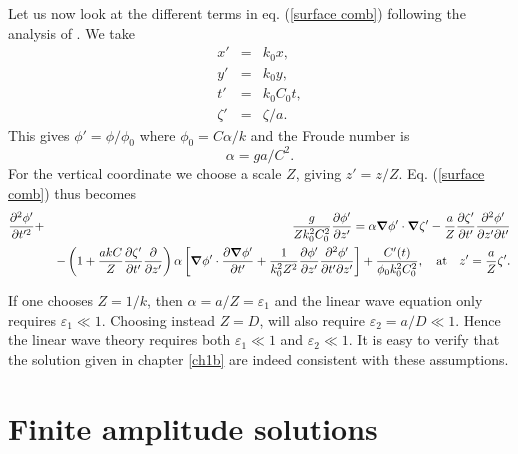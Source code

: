 Let us now look at the different terms in eq. (\ref{surface comb})
 following the analysis of \cite{Kirby1998}. We take 
 \begin{eqnarray}
  x'&=&k_0 x, \\
  y'&=& k_0 y, \\
  t'&=&k_0 C_0 t, \\
  \zeta'&=&\zeta/a.
 \end{eqnarray}
 This gives  $\phi'=\phi/\phi_0$
where $\phi_0= C \alpha /k$ and the Froude number is 
 \begin{equation}
\alpha=g a / C^2.
 \end{equation}
For the vertical coordinate we choose a scale  $Z$, giving $z'=z/Z$. 
Eq. (\ref{surface comb}) thus becomes 
\begin{eqnarray}
   \frac{\partial^2{\phi'}}{\partial{t'^2}}&+&\frac{g}{Z k_0^2 C_0^2} \frac{\partial\phi'}{\partial
   z'}=
\alpha  \mbox{\boldmath $\nabla$}\phi' \cdot \mbox{\boldmath $\nabla$}\zeta' - \frac{a}{Z} \frac{\partial
\zeta'}{\partial t'}\frac{\partial^2 \phi'}{\partial z' \partial t'}
\nonumber\\
& &- \left(1+\frac{akC}{Z} \frac{\partial \zeta'}{\partial t'}\frac{\partial
}{\partial z'}\right) \alpha \left[\mbox{\boldmath $\nabla$}\phi' \cdot
\frac{\partial{\mbox{\boldmath $\nabla$}\phi'}}{\partial t'} + \frac{1}{k_0^2 Z^2}
\frac{\partial\phi'}{\partial z'}\frac{\partial^2\phi'}{\partial t'\partial
z'}\right]+\frac{C'(t)}{\phi_0 k_0^2 C_0^2}, \quad \mbox{at} \quad
z'=\frac{a}{Z}\zeta'. \nonumber\\ \label{surface comb_scale}
\end{eqnarray}

If one chooses $Z=1/k$, then $\alpha=a/Z=\varepsilon_1$ and the linear wave equation only requires  $\varepsilon_1 \ll 1$. Choosing instead $Z=D$, will also require $\varepsilon_2=a/D \ll 1$. 
Hence the linear wave theory requires both $\varepsilon_1 \ll 1$  and $\varepsilon_2 \ll 1$. It is easy to verify that the solution given in chapter \ref{ch1b} 
are indeed consistent with these assumptions.




\section{Finite amplitude solutions}\label{ch_nonlin_per}
